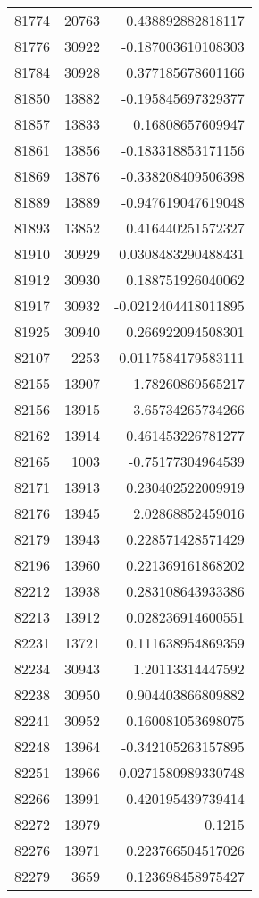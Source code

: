 \begin{tabular}{r | r | r}
81774 & 20763 & 0.438892882818117 \\
81776 & 30922 & -0.187003610108303 \\
81784 & 30928 & 0.377185678601166 \\
81850 & 13882 & -0.195845697329377 \\
81857 & 13833 & 0.16808657609947 \\
81861 & 13856 & -0.183318853171156 \\
81869 & 13876 & -0.338208409506398 \\
81889 & 13889 & -0.947619047619048 \\
81893 & 13852 & 0.416440251572327 \\
81910 & 30929 & 0.0308483290488431 \\
81912 & 30930 & 0.188751926040062 \\
81917 & 30932 & -0.0212404418011895 \\
81925 & 30940 & 0.266922094508301 \\
82107 & 2253 & -0.0117584179583111 \\
82155 & 13907 & 1.78260869565217 \\
82156 & 13915 & 3.65734265734266 \\
82162 & 13914 & 0.461453226781277 \\
82165 & 1003 & -0.75177304964539 \\
82171 & 13913 & 0.230402522009919 \\
82176 & 13945 & 2.02868852459016 \\
82179 & 13943 & 0.228571428571429 \\
82196 & 13960 & 0.221369161868202 \\
82212 & 13938 & 0.283108643933386 \\
82213 & 13912 & 0.028236914600551 \\
82231 & 13721 & 0.111638954869359 \\
82234 & 30943 & 1.20113314447592 \\
82238 & 30950 & 0.904403866809882 \\
82241 & 30952 & 0.160081053698075 \\
82248 & 13964 & -0.342105263157895 \\
82251 & 13966 & -0.0271580989330748 \\
82266 & 13991 & -0.420195439739414 \\
82272 & 13979 & 0.1215 \\
82276 & 13971 & 0.223766504517026 \\
82279 & 3659 & 0.123698458975427 \\

\end{tabular}
